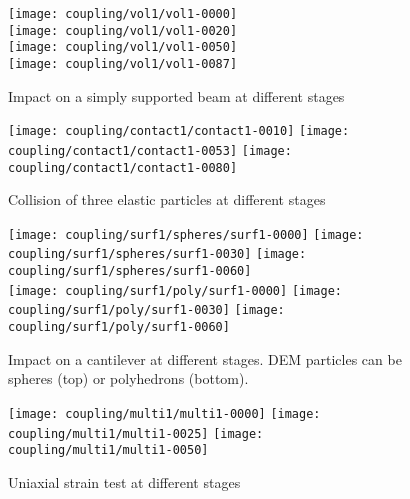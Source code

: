 \cleardoublepage

\begin{figure}[p]
	\centering
	\texttt{[image: coupling/vol1/vol1-0000]}
	\\
	\texttt{[image: coupling/vol1/vol1-0020]}
	\\
	\texttt{[image: coupling/vol1/vol1-0050]}
	\\
	\texttt{[image: coupling/vol1/vol1-0087]}
	\caption{Impact on a simply supported beam at different stages}
	\label{figCouplingConcurrentVolumeExample1}
\end{figure}

\begin{figure}[p]
	\centering
	\texttt{[image: coupling/contact1/contact1-0010]}
	\texttt{[image: coupling/contact1/contact1-0053]}
	\texttt{[image: coupling/contact1/contact1-0080]}
	\caption{Collision of three elastic particles at different stages}
	\label{figCouplingConcurrentContactExample1}
\end{figure}

\begin{figure}[p]
	\centering
	\texttt{[image: coupling/surf1/spheres/surf1-0000]}
	\texttt{[image: coupling/surf1/spheres/surf1-0030]}
	\texttt{[image: coupling/surf1/spheres/surf1-0060]}
	\\
	\texttt{[image: coupling/surf1/poly/surf1-0000]}
	\texttt{[image: coupling/surf1/poly/surf1-0030]}
	\texttt{[image: coupling/surf1/poly/surf1-0060]}
	\caption[Impact on a cantilever at different stages]{Impact on a cantilever at different stages. DEM particles can be spheres (top) or polyhedrons (bottom).}
	\label{figCouplingConcurrentSurfaceExample1}
\end{figure}

\begin{figure}[p]
	\centering
	\texttt{[image: coupling/multi1/multi1-0000]}
	\texttt{[image: coupling/multi1/multi1-0025]}
	\texttt{[image: coupling/multi1/multi1-0050]}
	\caption{Uniaxial strain test at different stages}
	\label{figCouplingConcurrentMultiExample1}
\end{figure}









